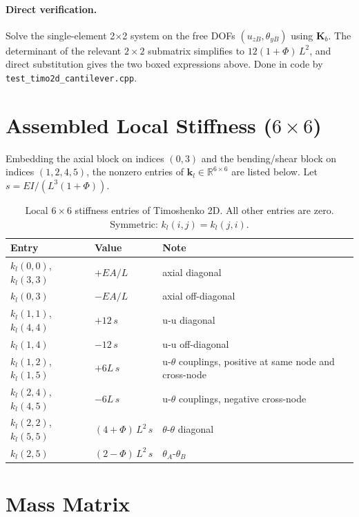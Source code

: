 \documentclass[11pt,a4paper]{article}
\newcommand{\bmath}[1]{\boldsymbol{#1}}
\begin{document}
\paragraph{Direct verification.}
Solve the single-element 2$\times$2 system on the free DOFs $(u_{zB}, \theta_{yB})$ using $\bmath{K}_b$. The determinant of the relevant $2\times2$ submatrix simplifies to $12(1+\Phi)\,L^2$, and direct substitution gives the two boxed expressions above. Done in code by \texttt{test\_timo2d\_cantilever.cpp}.

\section{Assembled Local Stiffness ($6\times6$)}\label{sec:6x6}

Embedding the axial block on indices $(0, 3)$ and the bending/shear block on indices $(1, 2, 4, 5)$, the nonzero entries of $\bmath{k}_l \in \mathbb{R}^{6\times6}$ are listed below. Let $s = EI / (L^3(1+\Phi))$.

\begin{table}[h!]
\centering
\begin{tabular}{l l l}
\toprule
Entry & Value & Note \\
\midrule
$k_l(0,0)$, $k_l(3,3)$ & $+EA/L$ & axial diagonal \\
$k_l(0,3)$ & $-EA/L$ & axial off-diagonal \\
$k_l(1,1)$, $k_l(4,4)$ & $+12\,s$ & u-u diagonal \\
$k_l(1,4)$ & $-12\,s$ & u-u off-diagonal \\
$k_l(1,2)$, $k_l(1,5)$ & $+6L\,s$ & u-$\theta$ couplings, positive at same node and cross-node \\
$k_l(2,4)$, $k_l(4,5)$ & $-6L\,s$ & u-$\theta$ couplings, negative cross-node \\
$k_l(2,2)$, $k_l(5,5)$ & $(4+\Phi)\,L^2\,s$ & $\theta$-$\theta$ diagonal \\
$k_l(2,5)$ & $(2-\Phi)\,L^2\,s$ & $\theta_A$-$\theta_B$ \\
\bottomrule
\end{tabular}
\caption{Local $6\times 6$ stiffness entries of Timoshenko 2D. All other entries are zero. Symmetric: $k_l(i,j) = k_l(j,i)$.}
\end{table}

\section{Mass Matrix}\label{sec:mass}
\end{document}
